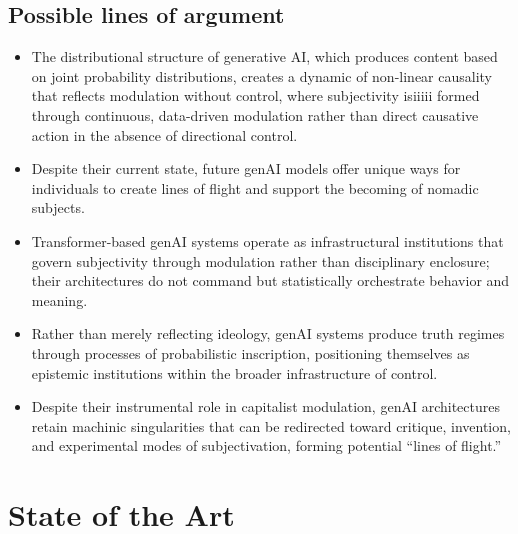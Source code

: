 \subsection{Possible lines of argument}
\begin{itemize}
	\item The distributional structure of generative AI, which produces content based on joint probability distributions, creates a dynamic of non-linear causality that reflects modulation without control, where subjectivity isiiiii formed through continuous, data-driven modulation rather than direct causative action in the absence of directional control. %
	\item Despite their current state, future genAI models
	      offer unique ways for individuals to create lines of
	      flight and support the becoming of nomadic subjects. %
	\item Transformer-based genAI systems operate as infrastructural institutions that govern subjectivity through modulation rather than disciplinary enclosure; their architectures do not command but statistically orchestrate behavior and meaning.
	\item Rather than merely reflecting ideology, genAI systems produce truth regimes through processes of probabilistic inscription, positioning themselves as epistemic institutions within the broader infrastructure of control.
	\item Despite their instrumental role in capitalist modulation, genAI architectures retain machinic singularities that can be redirected toward critique, invention, and experimental modes of subjectivation, forming potential “lines of flight.”
\end{itemize}



\section{State of the Art}


